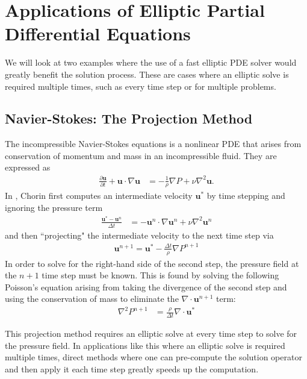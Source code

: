 \section{Applications of Elliptic Partial Differential Equations}
\label{sec:applications}

We will look at two examples where the use of a fast elliptic PDE solver would greatly benefit the solution process. These are cases where an elliptic solve is required multiple times, such as every time step or for multiple problems.

\subsection{Navier-Stokes: The Projection Method}

The incompressible Navier-Stokes equations is a nonlinear PDE that arises from conservation of momentum and mass in an incompressible fluid. They are expressed as
\begin{align}
    \frac{\partial \textbf{u}}{\partial t} + \textbf{u} \cdot \nabla \textbf{u} &= -\frac{1}{\rho} \nabla P + \nu \nabla^2 \textbf{u}.
\end{align}
In \citep{chorin1967numerical}, Chorin first computes an intermediate velocity $\textbf{u}^*$ by time stepping and ignoring the pressure term
\begin{align}
    \frac{\textbf{u}^* - \textbf{u}^n}{\Delta t} &= -\textbf{u}^n \cdot \nabla \textbf{u}^n + \nu \nabla^2 \textbf{u}^n
\end{align}
and then ``projecting" the intermediate velocity to the next time step via
\begin{align}
    \textbf{u}^{n+1} = \textbf{u}^* - \frac{\Delta t}{\rho} \nabla P^{n+1}
\end{align}
In order to solve for the right-hand side of the second step, the pressure field at the $n+1$ time step must be known. This is found by solving the following Poisson's equation arising from taking the divergence of the second step and using the conservation of mass to eliminate the $\nabla \cdot \textbf{u}^{n+1}$ term:
\begin{align}
    \nabla^2 P^{n+1} &= \frac{\rho}{\Delta t} \nabla \cdot \textbf{u}^*
\end{align}

This projection method requires an elliptic solve at every time step to solve for the pressure field. In applications like this where an elliptic solve is required multiple times, direct methods where one can pre-compute the solution operator and then apply it each time step greatly speeds up the computation.

